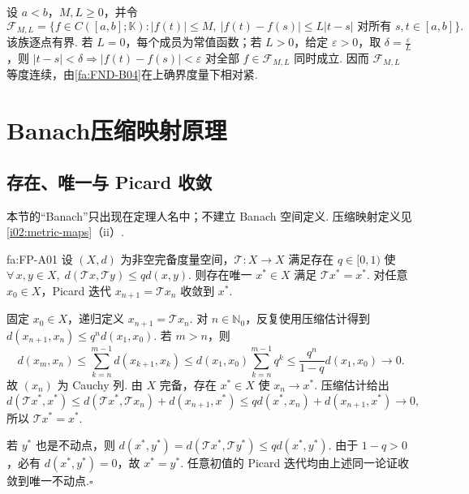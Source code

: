 \begin{FAExample}
设 \(\displaystyle a<b\)，\(\displaystyle M,L\geqslant0\)，并令
\[
\mathcal F_{M,L}
=\{f\in C([a,b];\mathbb K): |f(t)|\leqslant M,\ |f(t)-f(s)|\leqslant L|t-s|\text{ 对所有 }s,t\in[a,b]\}.
\]
该族逐点有界. 若 \(\displaystyle L=0\)，每个成员为常值函数；若 \(\displaystyle L>0\)，给定 \(\displaystyle \varepsilon>0\)，取 \(\displaystyle \delta=\frac{\varepsilon}{L}\)，则 \(\displaystyle |t-s|<\delta\Rightarrow |f(t)-f(s)|<\varepsilon\) 对全部 \(\displaystyle f\in\mathcal F_{M,L}\) 同时成立. 因而 \(\displaystyle \mathcal F_{M,L}\) 等度连续，由\autoref{fa:FND-B04}在上确界度量下相对紧.
\end{FAExample}

\section{Banach压缩映射原理}\label{sec:i02-contraction}

\subsection{存在、唯一与 Picard 收敛}

本节的“Banach”只出现在定理人名中；不建立 Banach 空间定义. 压缩映射定义见\autoref{i02:metric-maps}（ii）.

\begin{FATheorem}{fa:FP-A01}
设 \(\displaystyle (X,d)\) 为非空完备度量空间，\(\displaystyle \mathcal T:X\to X\) 满足存在 \(\displaystyle q\in[0,1)\) 使 \(\displaystyle \forall\,x,y\in X,\; d(\mathcal T x,\mathcal T y)\leqslant qd(x,y)\).
则存在唯一 \(\displaystyle x^*\in X\) 满足 \(\displaystyle \mathcal T x^*=x^*\). 对任意 \(\displaystyle x_0\in X\)，Picard 迭代 \(\displaystyle x_{n+1}=\mathcal T x_n\) 收敛到 \(\displaystyle x^*\).
\end{FATheorem}

\begin{FAProof}
固定 \(\displaystyle x_0\in X\)，递归定义 \(\displaystyle x_{n+1}=\mathcal T x_n\). 对 \(\displaystyle n\in\mathbb N_0\)，反复使用压缩估计得到 \(\displaystyle d(x_{n+1},x_n) \leqslant q^n d(x_1,x_0)\).
若 \(\displaystyle m>n\)，则
\[
d(x_m,x_n) \leqslant\sum_{k=n}^{m-1}d(x_{k+1},x_k) \leqslant d(x_1,x_0)\sum_{k=n}^{m-1}q^k \leqslant \frac{q^n}{1-q}d(x_1,x_0)\longrightarrow0.
\]
故 \(\displaystyle (x_n)\) 为 Cauchy 列. 由 \(\displaystyle X\) 完备，存在 \(\displaystyle x^*\in X\) 使 \(\displaystyle x_n\to x^*\). 压缩估计给出
\[
d(\mathcal T x^*,x^*)
\leqslant d(\mathcal T x^*,\mathcal T x_n)+d(x_{n+1},x^*)
\leqslant qd(x^*,x_n)+d(x_{n+1},x^*)\longrightarrow0,
\]
所以 \(\displaystyle \mathcal T x^*=x^*\).

若 \(\displaystyle y^*\) 也是不动点，则
\(\displaystyle d(x^*,y^*)=d(\mathcal T x^*,\mathcal T y^*)\leqslant qd(x^*,y^*)\).
由于 \(\displaystyle 1-q>0\)，必有 \(\displaystyle d(x^*,y^*)=0\)，故 \(\displaystyle x^*=y^*\). 任意初值的 Picard 迭代均由上述同一论证收敛到唯一不动点.\hfill\(\square\)
\end{FAProof}

